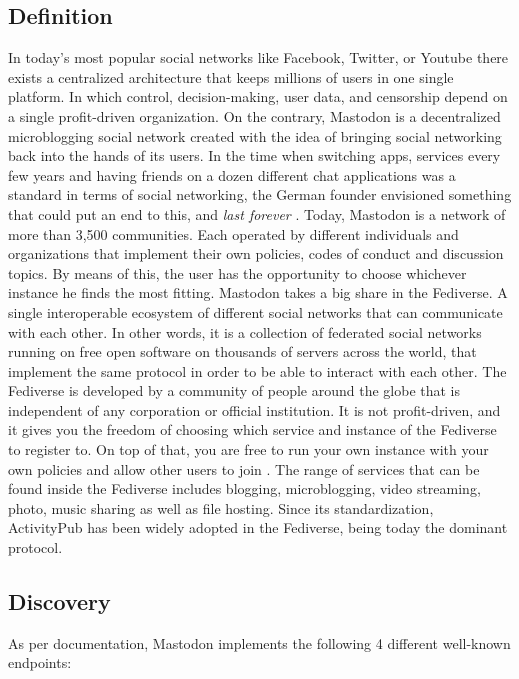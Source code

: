 \subsection{Definition}
In today's most popular social networks like Facebook, Twitter, or Youtube there exists a centralized architecture that keeps millions of users in one single platform. In which control, decision-making, user data, and censorship depend on a single profit-driven organization. On the contrary, Mastodon is a decentralized microblogging social network created with the idea of bringing social networking back into the hands of its users. In the time when switching apps, services every few years and having friends on a dozen different chat applications was a standard in terms of social networking, the German founder envisioned something that could put an end to this, and \emph{last forever} \cite{tilley_2018}. Today, Mastodon is a network of more than 3,500 communities. Each operated by different individuals and organizations that implement their own policies, codes of conduct and discussion topics. By means of this,  the user has the opportunity to choose whichever instance he finds the most fitting.
Mastodon takes a big share in the Fediverse. A single interoperable ecosystem of different social networks that can communicate with each other. In other words, it is a collection of federated social networks running on free open software on thousands of servers across the world, that implement the same protocol in order to be able to interact with each other. The Fediverse is developed by a community of people around the globe that is independent of any corporation or official institution. It is not profit-driven, and it gives you the freedom of choosing which service and instance of the Fediverse to register to. On top of that, you are free to run your own instance with your own policies and allow other users to join \cite{holloway_2018}. The range of services that can be found inside the Fediverse includes blogging, microblogging, video streaming, photo, music sharing as well as file hosting. Since its standardization, ActivityPub has been widely adopted in the Fediverse, being today the dominant protocol.

\subsection{Discovery}

\cite{nottingham_2019}
As per documentation, Mastodon implements the following 4 different well-known endpoints: 

